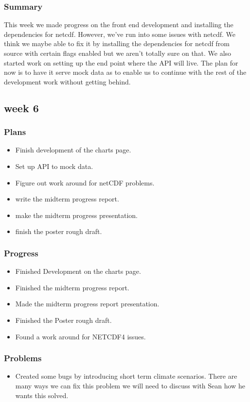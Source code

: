 \documentclass[onecolumn, draftclsnofoot,10pt, compsoc]{article}
\begin{document}
			\subsubsection{Summary}
			 This week we made progress on the front end development and installing the dependencies for netcdf. However, we've run into some issues with netcdf. We think we maybe able to fix it by installing the dependencies for netcdf from source with certain flags enabled but we aren't totally sure on that. We also started work on setting up the end point where the API will live. The plan for now is to have it serve mock data as to enable us to continue with the rest of the development work without getting behind.\\

		\subsection{week 6}
			\subsubsection{Plans}
				\begin{itemize}
					\item Finish development of the charts page.
					\item Set up API to mock data.
					\item Figure out work around for netCDF problems.
					\item write the midterm progress report.
					\item make the midterm progress presentation.
					\item finish the poster rough draft.
				\end{itemize}
			\subsubsection{Progress}
				\begin{itemize}
					\item Finished Development on the charts page.
					\item Finished the midterm progress report.
					\item Made the midterm progress report presentation.
					\item Finished the Poster rough draft.
					\item Found a work around for NETCDF4 issues.
				\end{itemize}
			\subsubsection{Problems}
				\begin{itemize}
					\item Created some bugs by introducing short term climate scenarios.
						\subitem There are many ways we can fix this problem we will need to discuss with Sean how he wants this solved.
				\end{itemize}
\end{document}
